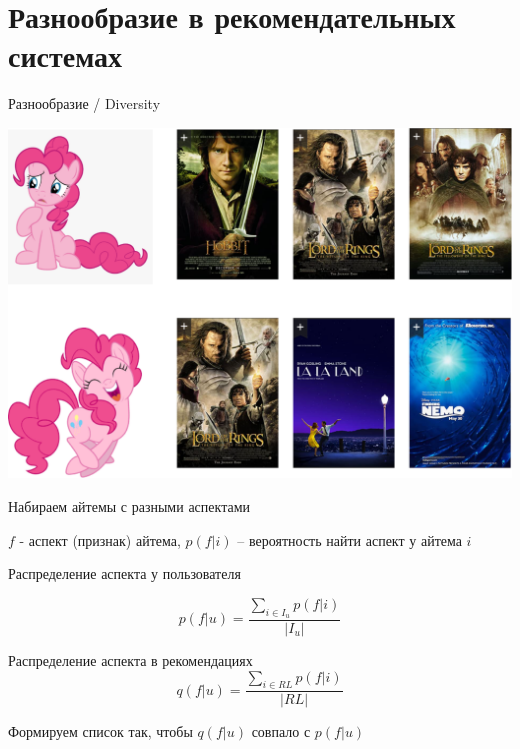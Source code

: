 \documentclass[11pt,aspectratio=169]{beamer}
\begin{document}
\section{Разнообразие в рекомендательных системах}

\begin{frame}{Разнообразие / Diversity}

\begin{center}
\includegraphics[scale=0.22]{images/diversity.png}
\end{center}

\end{frame}

\begin{frame}{Набираем айтемы с разными аспектами}

$f$ - аспект (признак) айтема, $p(f | i)$ -- вероятность найти аспект у айтема $i$

\vfill

Распределение аспекта у пользователя

\[
p(f | u) = \frac{\sum_{i \in I_u} p(f | i)}{|I_u|}  
\]

Распределение аспекта в рекомендациях
\[
q(f | u) = \frac{\sum_{i \in RL} p(f | i)}{|RL|}
\]

\begin{tcolorbox}[colback=info!5,colframe=info!80,title=]
Формируем список так, чтобы $q(f | u)$ совпало с $p(f | u)$
\end{tcolorbox}

\end{frame}
\end{document}

